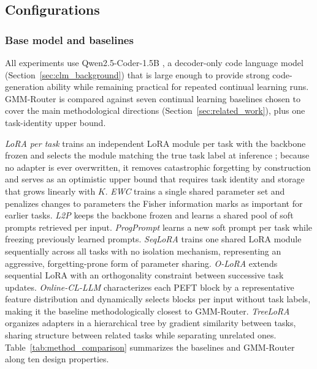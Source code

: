 \subsection{Configurations}
\label{sec:setup}

\subsubsection{Base model and baselines}
\label{sec:baselines}

All experiments use Qwen2.5-Coder-1.5B \citep{hui2024qwen25coder}, a decoder-only code language model (Section~\ref{sec:clm_background}) that is large enough to provide strong code-generation ability while remaining practical for repeated continual learning runs. GMM-Router is compared against seven continual learning baselines chosen to cover the main methodological directions (Section~\ref{sec:related_work}), plus one task-identity upper bound.

\emph{LoRA per task} trains an independent LoRA module per task with the backbone frozen and selects the module matching the true task label at inference \citep{hu2022lora}; because no adapter is ever overwritten, it removes catastrophic forgetting by construction and serves as an optimistic upper bound that requires task identity and storage that grows linearly with $K$. \emph{EWC} \citep{kirkpatrick2017overcoming} trains a single shared parameter set and penalizes changes to parameters the Fisher information marks as important for earlier tasks. \emph{L2P} \citep{wang2022learning} keeps the backbone frozen and learns a shared pool of soft prompts retrieved per input. \emph{ProgPrompt} \citep{razdaibiedina2023progressive} learns a new soft prompt per task while freezing previously learned prompts. \emph{SeqLoRA} trains one shared LoRA module sequentially across all tasks with no isolation mechanism, representing an aggressive, forgetting-prone form of parameter sharing. \emph{O-LoRA} \citep{wang2023orthogonal} extends sequential LoRA with an orthogonality constraint between successive task updates. \emph{Online-CL-LLM} \citep{cheng2025exploiting} characterizes each PEFT block by a representative feature distribution and dynamically selects blocks per input without task labels, making it the baseline methodologically closest to GMM-Router. \emph{TreeLoRA} \citep{qian2025treelora} organizes adapters in a hierarchical tree by gradient similarity between tasks, sharing structure between related tasks while separating unrelated ones. Table~\ref{tab:method_comparison} summarizes the baselines and GMM-Router along ten design properties.

